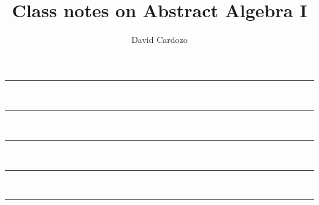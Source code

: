 \documentclass[notitlepage]{article}
\author{David Cardozo}
\title{Class notes on Abstract Algebra I}
\begin{document}



\noindent\rule{\textwidth}{1pt}\\[-0.1cm]


\noindent\rule{\textwidth}{1pt}\\[-0.1cm]
	

\noindent\rule{\textwidth}{1pt}\\[-0.1cm]


\noindent\rule{\textwidth}{1pt}\\[-0.1cm]


\noindent\rule{\textwidth}{1pt}\\[-0.1cm]




	
\end{document}
